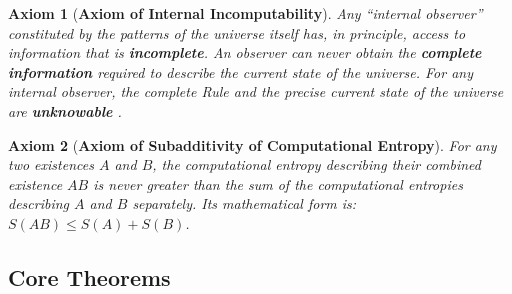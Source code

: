 \documentclass[11pt, a4paper]{article}
\newtheorem{axiom}{Axiom}[section]
\begin{document}
\begin{axiom}[\textbf{Axiom of Internal Incomputability}]
Any ``internal observer'' constituted by the patterns of the universe itself has, in principle, access to information that is \textbf{incomplete}. An observer can never obtain the \textbf{complete information} required to describe the current state of the universe. For any internal observer, the complete Rule and the precise current state of the universe are \textbf{unknowable} \cite{Turing1936}.
\end{axiom}

\begin{axiom}[\textbf{Axiom of Subadditivity of Computational Entropy}]
For any two existences $A$ and $B$, the computational entropy describing their combined existence $AB$ is never greater than the sum of the computational entropies describing $A$ and $B$ separately. Its mathematical form is: $S(AB) \le S(A) + S(B)$.
\end{axiom}

\subsection*{Core Theorems}
\end{document}
